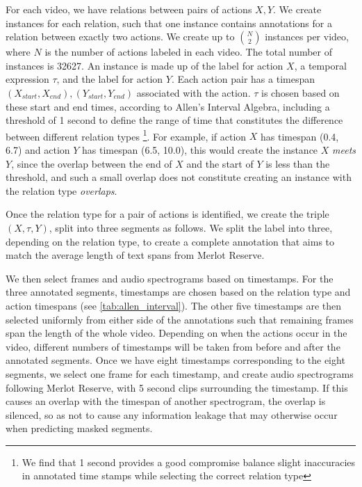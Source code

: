 For each video, we have relations between pairs of actions $X, Y$.  We create
instances for each relation, such that one instance contains annotations for a
relation between exactly two actions. We create up to $\binom{N}{2}$ instances
per video, where $N$ is the number of actions labeled in each video. The total
number of instances is 32627. An instance is made up of the label for action
$X$, a temporal expression $\tau$, and the label for action $Y$. Each action
pair has a timespan $(X_{start}, X_{end}), (Y_{start}, Y_{end})$ associated
with the action. $\tau$ is chosen based on these start and end times, according
to Allen's Interval Algebra, including a threshold of 1 second to define the
range of time that constitutes the difference between different relation types
\footnote{We find that 1 second provides a good compromise balance slight
inaccuracies in annotated time stamps while selecting the correct relation
type}. For example, if action $X$ has timespan (0.4, 6.7) and action $Y$ has
timespan (6.5, 10.0), this would create the instance $X$ \textit{meets} $Y$,
since the overlap between the end of $X$ and the start of $Y$ is less than the
threshold, and such a small overlap does not constitute creating an instance
with the relation type \textit{overlaps}.

Once the relation type for a pair of actions is identified, we create the
triple $(X,\tau,Y)$, split into three segments as follows. We split the label
into three, depending on the relation type, to create a complete annotation
that aims to match the average length of text spans from Merlot Reserve.


We then select frames and audio spectrograms based on timestamps. For the three
annotated segments, timestamps are chosen based on the relation type and action
timespans (see \cref{tab:allen_interval}). The other five timestamps are then
selected uniformly from either side of the annotations such that remaining
frames span the length of the whole video. Depending on when the actions occur
in the video, different numbers of timestamps will be taken from before and
after the annotated segments. Once we have eight timestamps corresponding to
the eight segments, we select one frame for each timestamp, and create audio
spectrograms following Merlot Reserve, with 5 second clips surrounding the
timestamp. If this causes an overlap with the timespan of another spectrogram,
the overlap is silenced, so as not to cause any information leakage that may
otherwise occur when predicting masked segments.

